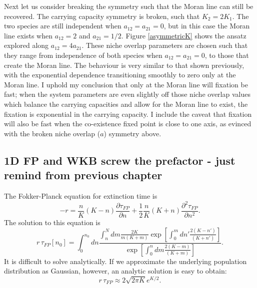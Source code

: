 Next let us consider breaking the symmetry such that the Moran line can still be recovered. %
The carrying capacity symmetry is broken, such that $K_2 = 2 K_1$. 
The two species are still independent when $a_{12}=a_{21}=0$, but in this case the Moran line exists when $a_{12} = 2$ and $a_{21} = 1/2$. 
Figure \ref{asymmetricK} shows the ansatz explored along $a_{12}=4 a_{21}$. %
These niche overlap parameters are chosen such that they range from independence of both species when $a_{12} = a_{21} = 0$, to those that create the Moran line. %
The behaviour is very similar to that shown previously, with the exponential dependence transitioning smoothly to zero only at the Moran line. 
I uphold my conclusion that only at the Moran line will fixation be fast; when the system parameters are even slightly off those niche overlap values which balance the carrying capacities and allow for the Moran line to exist, the fixation is exponential in the carrying capacity. %
I include the caveat that fixation will also be fast when the co-existence fixed point is close to one axis, as evinced with the broken niche overlap ($a$) symmetry above. 


\iffalse
\subsection{1D FP and WKB screw the prefactor - just remind from previous chapter}
The Fokker-Planck equation for extinction time is \cite{Nisbet1982}
\begin{equation}
-r = \frac{n}{K}(K-n)\frac{\partial\tau_{FP}}{\partial n}+\frac{1}{2}\frac{n}{K}(K+n)\frac{\partial^2\tau_{FP}}{\partial n^2}.  
\end{equation}
The solution to this equation is
\begin{equation} \label{fpe-etime}
r\,\tau_{FP}[n_0] = \int^{n_0}_0 dn\frac{\int_n^N dm\frac{2K}{m(K+m)}\exp[\int^m_0dn'\frac{2(K-n')}{(K+n')}]}{\exp[\int^n_0dm\frac{2(K-m)}{(K+m)}]}.  
\end{equation}
It is difficult to solve analytically. 
If we approximate the underlying population distribution as Gaussian, however, an analytic solution is easy to obtain:
\begin{equation}
r\,\tau_{FP} \approx 2\sqrt{2\pi K}e^{K/2}. 
\end{equation}

